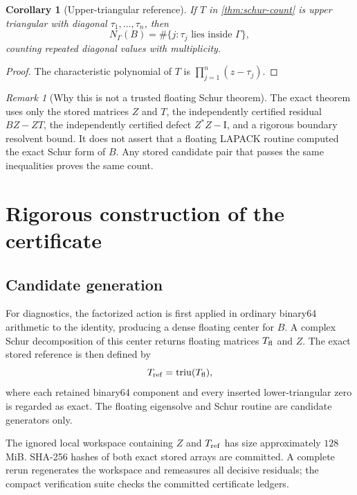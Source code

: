 \documentclass[11pt]{article}
\newtheorem{corollary}[theorem]{Corollary}
\theoremstyle{definition}
\theoremstyle{remark}
\newtheorem{remark}[theorem]{Remark}
\newcommand{\Id}{\mathrm I}
\newcommand{\Tref}{T_{\rm ref}}
\begin{document}
\begin{corollary}[Upper-triangular reference]
\label{cor:triangular-count}
If \(T\) in \cref{thm:schur-count} is upper triangular with diagonal
\(\tau_1,\ldots,\tau_n\), then
\begin{equation}
 N_\Gamma(B)
 =\#\{j:\tau_j\text{ lies inside }\Gamma\},
 \label{eq:triangular-count}
\end{equation}
counting repeated diagonal values with multiplicity.
\end{corollary}

\begin{proof}
The characteristic polynomial of \(T\) is
\(\prod_{j=1}^n(z-\tau_j)\).
\end{proof}

\begin{remark}[Why this is not a trusted floating Schur theorem]
\label{rem:not-floating-schur}
The exact theorem uses only the stored matrices \(Z\) and \(T\), the
independently certified residual \(BZ-ZT\), the independently certified
defect \(Z^*Z-\Id\), and a rigorous boundary resolvent bound.  It does not
assert that a floating LAPACK routine computed the exact Schur form of
\(B\).  Any stored candidate pair that passes the same inequalities proves
the same count.
\end{remark}

\section{Rigorous construction of the certificate}
\label{sec:construction}

\subsection{Candidate generation}

For diagnostics, the factorized action is first applied in ordinary
binary64 arithmetic to the identity, producing a dense floating center for
\(B\).  A complex Schur decomposition of this center returns floating
matrices \(T_{\rm fl}\) and \(Z\).  The exact stored reference is then
defined by
\begin{equation}
 \Tref=\operatorname{triu}(T_{\rm fl}),
 \label{eq:tref}
\end{equation}
where each retained binary64 component and every inserted lower-triangular
zero is regarded as exact.  The floating eigensolve and Schur routine are
candidate generators only.

The ignored local workspace containing \(Z\) and \(\Tref\) has size
approximately \(128\) MiB.  SHA-256 hashes of both exact stored arrays are
committed.  A complete rerun regenerates the workspace and remeasures all
decisive residuals; the compact verification suite checks the committed
certificate ledgers.
\end{document}
